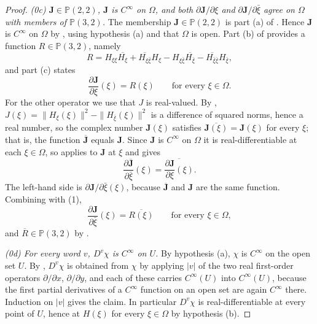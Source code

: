 \begin{proof}
\emph{(0c) $\mathbf{J}\in\mathbb{P}(2,2)$, $\mathbf{J}$ is $C^\infty$ on
$\Omega$, and both $\partial\mathbf{J}/\partial\xi$ and
$\partial\mathbf{J}/\partial\bar\xi$ agree on $\Omega$ with members of
$\mathbb{P}(3,2)$.}  The membership $\mathbf{J}\in\mathbb{P}(2,2)$ is part (a)
of .  Hence $\mathbf{J}$ is $C^\infty$ on $\Omega$ by
, using hypothesis (a) and that $\Omega$ is open.  Part
(b) of  provides a function $R\in\mathbb{P}(3,2)$, namely
\[
  R=H_{\xi\xi}\overline{H_\xi}+\overline{H_{\xi\bar\xi}}H_\xi
     -H_{\xi\bar\xi}\overline{H_{\bar\xi}}-\overline{H_{\bar\xi\bar\xi}}H_{\bar\xi},
\]
and part (c) states
\begin{equation}\tag{1}
  \frac{\partial\mathbf{J}}{\partial\xi}(\xi)=R(\xi)\qquad\text{for every }\xi\in\Omega .
\end{equation}
For the other operator we use that $J$ is real-valued.  By ,
$J(\xi)=\|H_\xi(\xi)\|^2-\|H_{\bar\xi}(\xi)\|^2$ is a difference of squared
norms, hence a real number, so the complex number $\mathbf{J}(\xi)$ satisfies
$\overline{\mathbf{J}(\xi)}=\mathbf{J}(\xi)$ for every $\xi$; that is, the
function $\overline{\mathbf{J}}$ equals $\mathbf{J}$.  Since $\mathbf{J}$ is
$C^\infty$ on $\Omega$ it is real-differentiable at each $\xi\in\Omega$, so
 applies to $\mathbf{J}$ at $\xi$ and gives
\[
  \frac{\partial\overline{\mathbf{J}}}{\partial\bar\xi}(\xi)
  =\overline{\frac{\partial\mathbf{J}}{\partial\xi}(\xi)} .
\]
The left-hand side is $\partial\mathbf{J}/\partial\bar\xi(\xi)$, because
$\overline{\mathbf{J}}$ and $\mathbf{J}$ are the same function.  Combining with
(1),
\begin{equation}\tag{2}
  \frac{\partial\mathbf{J}}{\partial\bar\xi}(\xi)=\overline{R(\xi)}
  \qquad\text{for every }\xi\in\Omega ,
\end{equation}
and $\overline{R}\in\mathbb{P}(3,2)$ by .

\emph{(0d) For every word $v$, $D^{v}\chi$ is $C^\infty$ on $U$.}  By
hypothesis (a), $\chi$ is $C^\infty$ on the open set $U$.  By
, $D^{v}\chi$ is obtained from $\chi$ by applying $|v|$ of
the two real first-order operators $\partial/\partial x$,
$\partial/\partial y$, and each of these carries $C^\infty(U)$ into
$C^\infty(U)$, because the first partial derivatives of a $C^\infty$ function
on an open set are again $C^\infty$ there.  Induction on $|v|$ gives the claim.
In particular $D^{v}\chi$ is real-differentiable at every point of $U$, hence
at $H(\xi)$ for every $\xi\in\Omega$ by hypothesis (b).


\end{proof}
